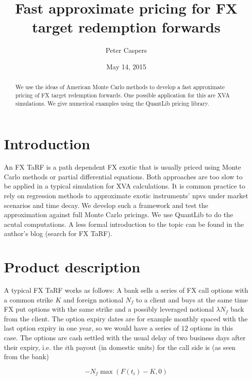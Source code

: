 \documentclass{amsart}
\theoremstyle{plain}
\numberwithin{equation}{section}
\begin{document}
\title[FX TaRF]{Fast approximate pricing for FX target redemption forwards}
\author{Peter Caspers}
\date{May 14, 2015}
\begin{abstract}
We use the ideas of American Monte Carlo methods to develop a fast approximate pricing of FX target redemption forwards. One possible application for this are XVA simulations. We give numerical examples using the QuantLib pricing library.
\end{abstract}
\maketitle

\section{Introduction}

An FX TaRF is a path dependent FX exotic that is usually priced using Monte Carlo methods or partial differential equations. Both approaches are too slow to be applied in a typical simulation for XVA calculations. It is common practice to rely on regression methods to approximate exotic instruments' npvs under market scenarios and time decay. We develop such a framework and test the approximation against full Monte Carlo pricings. We use QuantLib\cite{ql} to do the acutal computations. A less formal introduction to the topic can be found in the author's blog\cite{blog} (search for FX TaRF).

\section{Product description}

A typical FX TaRF works as follows: A bank sells a series of FX call options with a common strike $K$ and foreign notional $N_f$ to a client and buys at the same time FX put options with the same strike and a possibly leveraged notional $\lambda N_f$ back from the client. The option expiry dates are for example monthly spaced with the last option expiry in one year, so we would have a series of $12$ options in this case. The options are cash settled with the usual delay of two business days after their expiry, i.e. the $i$th payout (in domestic units) for the call side is (as seen from the bank)

\begin{equation}
- N_f \max( F(t_i) - K , 0 )
\end{equation}
\end{document}

